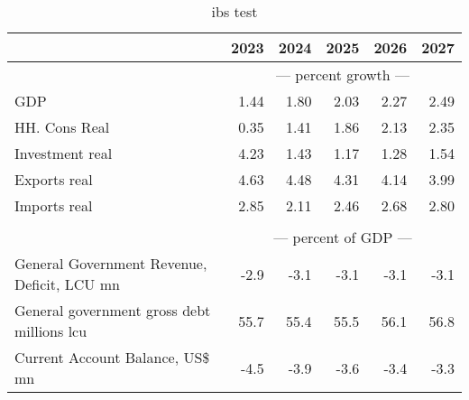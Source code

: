 \documentclass{article}
\begin{document}
\begin{table}[ht]
\caption{ibs test}
\begin{tabular}{lrrrrr}
\toprule
 & 2023 & 2024 & 2025 & 2026 & 2027 \\
\midrule
&\multicolumn{5}{c}{{--- percent growth ---}}                                                                                                     \\
GDP & 1.44 & 1.80 & 2.03 & 2.27 & 2.49 \\
HH. Cons Real & 0.35 & 1.41 & 1.86 & 2.13 & 2.35 \\
Investment real & 4.23 & 1.43 & 1.17 & 1.28 & 1.54 \\
Exports real & 4.63 & 4.48 & 4.31 & 4.14 & 3.99 \\
Imports real & 2.85 & 2.11 & 2.46 & 2.68 & 2.80 \\
&\multicolumn{5}{c}{{ }}                                                                                                     \\
&\multicolumn{5}{c}{{--- percent of GDP ---}}                                                                                                     \\
General Government Revenue, Deficit, LCU mn & -2.9 & -3.1 & -3.1 & -3.1 & -3.1 \\
General government gross debt millions lcu & 55.7 & 55.4 & 55.5 & 56.1 & 56.8 \\
Current Account Balance, US\$ mn & -4.5 & -3.9 & -3.6 & -3.4 & -3.3 \\
\bottomrule
\end{tabular}
\end{table}
\end{document}
